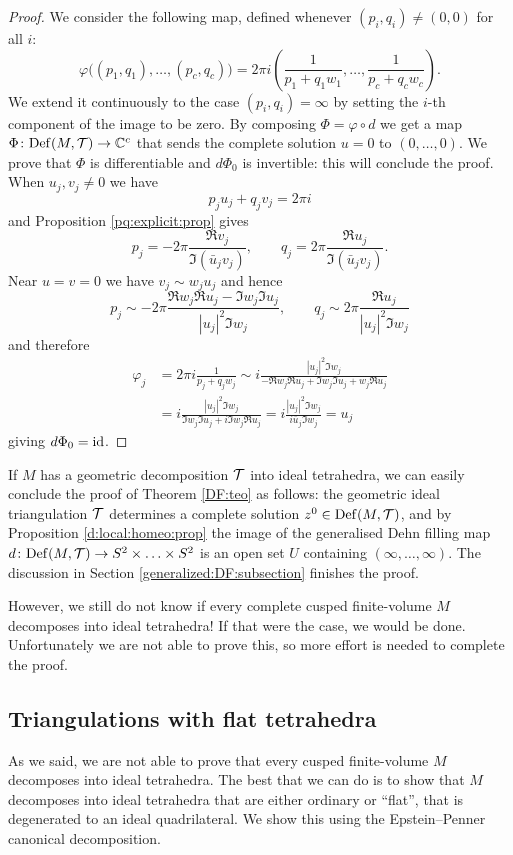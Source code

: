 \begin{proof}
We consider the following map, defined whenever $(p_i,q_i) \neq (0,0)$ for all $i$:
$$\varphi\big((p_1,q_1), \ldots, (p_c, q_c)\big) = 2\pi i \left( \frac 1 {p_1+q_1w_1}, \ldots, \frac 1{p_c + q_cw_c}\right).$$
We extend it continuously to the case $(p_i, q_i) = \infty$ by setting the $i$-th component of the image to be zero.
By composing $\Phi = \varphi \circ d$ we get a map $\Phi\colon {\rm Def}(M,\mathcal{T}) \to \mathbb{C}^c$ that sends the complete solution $u=0$ to $(0,\ldots,0)$. We prove that $\Phi$ is differentiable and $d\Phi_0$ is invertible: this will conclude the proof. When $u_j, v_j \neq 0$ we have
$$p_ju_j + q_jv_j = 2\pi i$$
and Proposition \ref{pq:explicit:prop} gives
$$p_j = - 2 \pi \frac{\Re v_j}{\Im (\bar u_j v_j)}, \qquad q_j = 2 \pi \frac{\Re u_j}{\Im (\bar u_jv_j)}.$$
Near $u=v=0$ we have $v_j \sim w_ju_j$ and hence
$$p_j \sim - 2 \pi \frac{\Re w_j \Re u_j - \Im w_j \Im u_j}{|u_j|^2\Im w_j}, \qquad
q_j \sim 2 \pi \frac{\Re u_j}{|u_j|^2\Im w_j}
$$
and therefore
\begin{align*}
\varphi_j & = 2\pi i \frac 1{p_j + q_jw_j} \sim i\frac{|u_j|^2 \Im w_j}{-\Re w_j \Re u_j + \Im w_j \Im u_j + w_j \Re u_j} \\
& =
i\frac{|u_j|^2 \Im w_j}{\Im w_j \Im u_j + i\Im w_j \Re u_j} 
=
i\frac{|u_j|^2 \Im w_j}{i \bar u_j \Im w_j} = u_j
\end{align*}
giving $d\Phi_0 = {\rm id}$. 
\end{proof}

If $M$ has a geometric decomposition $\mathcal{T}$ into ideal tetrahedra, we can easily conclude the proof of Theorem \ref{DF:teo} as follows: the geometric ideal triangulation $\mathcal{T}$ determines a complete solution $z^0 \in {\rm Def}(M,\mathcal{T})$, and by Proposition \ref{d:local:homeo:prop} the image of the generalised Dehn filling map $d\colon {\rm Def}(M,\mathcal{T}) \to S^2\times \ldots \times S^2$ is an open set $U$ containing $(\infty, \ldots, \infty)$. The discussion in Section \ref{generalized:DF:subsection} finishes the proof.

However, we still do not know if every complete cusped finite-volume $M$ decomposes into ideal tetrahedra! If that were the case, we would be done. Unfortunately we are not able to prove this, so more effort is needed to complete the proof.

\subsection{Triangulations with flat tetrahedra}
As we said, we are not able to prove that every cusped finite-volume $M$ decomposes into ideal tetrahedra. The best that we can do is to show that $M$ decomposes into ideal tetrahedra that are either ordinary or ``flat'', that is degenerated to an ideal quadrilateral. We show this using the Epstein--Penner canonical decomposition.

